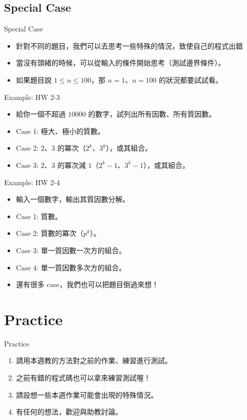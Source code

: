 \documentclass[t]{beamer}
\begin{document}
\subsection{Special Case}
\begin{frame}{Special Case}
  \begin{itemize}
    \item 針對不同的題目，我們可以去思考一些特殊的情況，致使自己的程式出錯
    \item 當沒有頭緒的時候，可以從輸入的條件開始思考（測試邊界條件）。
    \item 如果題目說 $1\le n\le 100$，那 $n=1$、$n=100$ 的狀況都要試試看。
  \end{itemize}
\end{frame}

\begin{frame}{Example: HW 2-3}
  \begin{itemize}
    \item 給你一個不超過 $10000$ 的數字，試列出所有因數、所有質因數。
    \item Case 1: 極大、極小的質數。
    \item Case 2: $2$、$3$ 的冪次（$2^k$、$3^k$），或其組合。
    \item Case 3: $2$、$3$ 的冪次減 $1$（$2^k-1$、$3^k-1$），或其組合。
  \end{itemize}
\end{frame}

\begin{frame}{Example: HW 2-4}
  \begin{itemize}
    \item 輸入一個數字，輸出其質因數分解。
    \item Case 1: 質數。
    \item Case 2: 質數的冪次（$p^k$）。
    \item Case 3: 單一質因數一次方的組合。
    \item Case 4: 單一質因數多次方的組合。
    \item 還有很多 case，我們也可以把題目倒過來想！
  \end{itemize}
\end{frame}

\section{Practice}
\begin{frame}{Practice}
  \begin{enumerate}
    \item 請用本週教的方法對之前的作業、練習進行測試。
    \item 之前有錯的程式碼也可以拿來練習測試喔！
    \item 請設想一些本週作業可能會出現的特殊情況。
    \item 有任何的想法，歡迎與助教討論。
  \end{enumerate}
\end{frame}

\end{document}
